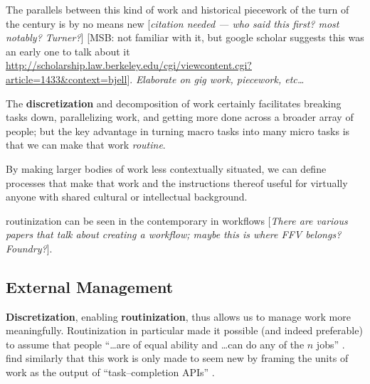 \documentclass{sigchi}
\newcommand{\msb}[1]{{\color{PineGreen}[MSB: #1]}}
\begin{document}
The parallels between this kind of work and
historical piecework of the turn of the  century
is by no means new
[\textit{citation needed --- who said this first? most notably? Turner?}] \msb{not familiar with it, but google scholar suggests this was an early one to talk about it \url{http://scholarship.law.berkeley.edu/cgi/viewcontent.cgi?article=1433&context=bjell}}.
\textit{Elaborate on gig work, piecework, etc\dots}

The \textbf{discretization} and decomposition of work certainly facilitates
breaking tasks down,
parallelizing work,
and getting more done across a broader array of people;
but the key advantage in turning macro tasks 
into many micro tasks is that we can make that work \textit{routine}.

By making larger bodies of work less contextually situated,
we can define processes that make that work
and the instructions thereof
useful for virtually anyone with shared cultural or intellectual background.

routinization can be seen in the contemporary in workflows
\cite{foundry,bernstein2015soylent}
[\textit{There are various papers that talk about creating a workflow;
maybe this is where FFV belongs? Foundry?}].



\subsection{External Management}
\textbf{Discretization}, enabling \textbf{routinization}, thus allows us to
manage work more meaningfully.
Routinization in particular made it possible
(and indeed preferable) to assume that people
``\dots are of equal ability and \dots can do any of the $n$ jobs''
\cite{hu1961parallel}.
\citeauthor{storiesIraniSilberman}
find similarly that
this work is only made to seem new by framing the units of work as the output of ``task--completion APIs''
\cite{storiesIraniSilberman}.
\end{document}
